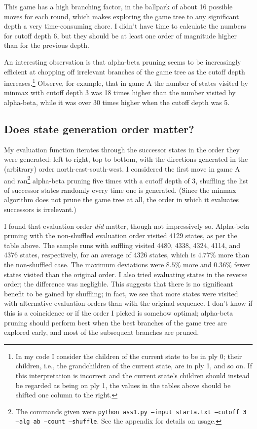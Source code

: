 \documentclass[letterpaper, 11pt]{article}
\numberwithin{theorem}{section}
\begin{document}
\noindent This game has a high branching factor, in the ballpark of about 16 possible moves for each round, which makes exploring the game tree to any significant depth a very time-consuming chore. I didn't have time to calculate the numbers for cutoff depth 6, but they should be at least one order of magnitude higher than for the previous depth.%

An interesting observation is that alpha-beta pruning seems to be increasingly efficient at chopping off irrelevant branches of the game tree as the cutoff depth increases.\footnote{In my code I consider the children of the current state to be in ply 0; their children, i.e., the grandchildren of the current state, are in ply 1, and so on. If this interpretation is incorrect and the current state's children should instead be regarded as being on ply 1, the values in the tables above should be shifted one column to the right.} Observe, for example, that in game A the number of states visited by minmax with cutoff depth 3 was 18 times higher than the number visited by alpha-beta, while it was over 30 times higher when the cutoff depth was 5.


\subsection{Does state generation order matter?}
My evaluation function iterates through the successor states in the order they were generated: left-to-right, top-to-bottom, with the directions generated in the (arbitrary) order north-east-south-west. I considered the first move in game A and ran\footnote{The commands given were \texttt{python ass1.py --input starta.txt --cutoff 3 --alg ab --count --shuffle}. See the appendix for details on usage.} alpha-beta pruning five times with a cutoff depth of 3, shuffling the list of successor states randomly every time one is generated. (Since the minmax algorithm does not prune the game tree at all, the order in which it evaluates successors is irrelevant.) 

I found that evaluation order \emph{did} matter, though not impressively so. Alpha-beta pruning with the non-shuffled evaluation order visited 4129 states, as per the table above. The sample runs with suffling visited 4480, 4338, 4324, 4114, and 4376 states, respectively, for an average of 4326 states, which is $4.77\%$ more than the non-shuffled case. The maximum deviations were $8.5\%$ more and $0.36\%$ fewer states visited than the original order. I also tried evaluating states in the reverse order; the difference was negligble. This suggests that there is no significant benefit to be gained by shuffling; in fact, we see that more states were visited with alternative evaluation orders than with the original sequence. I don't know if this is a coincidence or if the order I picked is somehow optimal; alpha-beta pruning should perform best when the best branches of the game tree are explored early, and most of the subsequent branches are pruned. 
\end{document}

